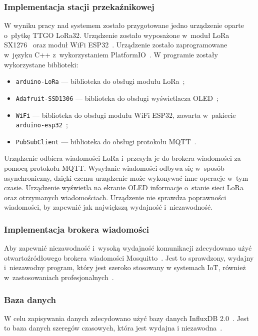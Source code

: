 \subsubsection{Implementacja stacji przekaźnikowej}
W wyniku pracy nad systemem zostało przygotowane jedno urządzenie oparte o~płytkę TTGO LoRa32.
Urządzenie zostało wyposażone w~moduł LoRa SX1276~\cite{ESP32:sx1276-doc} oraz moduł WiFi ESP32~\cite{ESP32:datasheet}.
Urządzenie zostało zaprogramowane w~języku C++ z~wykorzystaniem PlatformIO~\cite{tool:pio}.
W programie zostały wykorzystane biblioteki:
\begin{itemize}
    \item \texttt{arduino-LoRa} — biblioteka do obsługi modułu LoRa~\cite{ESP32:lora-lib};
    \item \texttt{Adafruit-SSD1306} — biblioteka do obsługi wyświetlacza OLED~\cite{ESP32:Adafruit-SSD1306};
    \item \texttt{WiFi} — biblioteka do obsługi modułu WiFi ESP32, zawarta w~pakiecie \texttt{arduino-esp32}~\cite{ESP32:Arduino};
    \item \texttt{PubSubClient} — biblioteka do obsługi protokołu MQTT~\cite{ESP32:PubSubClient}.
\end{itemize}

Urządzenie odbiera wiadomości LoRa i~przesyła je do brokera wiadomości za pomocą protokołu MQTT.
Wysyłanie wiadomości odbywa się w~sposób asynchroniczny, dzięki czemu urządzenie może wykonywać inne operacje w~tym czasie.
Urządzenie wyświetla na ekranie OLED informacje o~stanie sieci LoRa oraz otrzymanych wiadomościach.
Urządzenie nie sprawdza poprawności wiadomości, by zapewnić jak największą wydajność i~niezawodność.

\subsubsection{Implementacja brokera wiadomości}\label{impl:mosquitto}
Aby zapewnić niezawodność i~wysoką wydajność komunikacji zdecydowano użyć otwartoźródłowego brokera wiadomości Mosquitto~\cite{tool:mosquitto}.
Jest to sprawdzony, wydajny i~niezawodny program, który jest szeroko stosowany w systemach IoT, również w~zastosowaniach profesjonalnych~\cite{tool:mosquitto}.

\subsubsection{Baza danych}\label{impl:db}
W celu zapisywania danych zdecydowano użyć bazy danych InfluxDB 2.0~\cite{tool:influxdb}. Jest to baza danych szeregów czasowych, która jest wydajna i niezawodna~\cite{tool:influxdb}.

